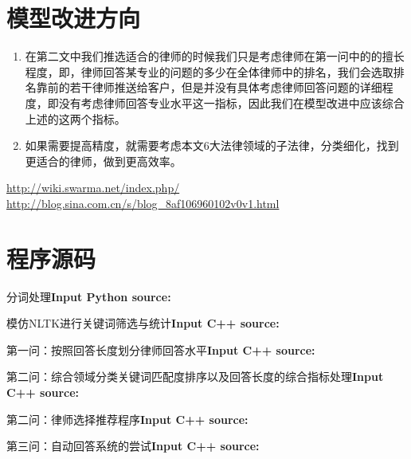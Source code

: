 \documentclass[bwprint]{cumcmthesis}
\begin{document}
\section{模型改进方向}
\begin{enumerate}
	\item 在第二文中我们推选适合的律师的时候我们只是考虑律师在第一问中的的擅长程度，即，律师回答某专业的问题的多少在全体律师中的排名，我们会选取排名靠前的若干律师推送给客户，但是并没有具体考虑律师回答问题的详细程度，即没有考虑律师回答专业水平这一指标，因此我们在模型改进中应该综合上述的这两个指标。
	\item 如果需要提高精度，就需要考虑本文6大法律领域的子法律，分类细化，找到更适合的律师，做到更高效率。
\end{enumerate}
\begin{thebibliography}{9}
  \url{http://wiki.swarma.net/index.php/}
  \url{http://blog.sina.com.cn/s/blog_8af106960102v0v1.html}
\end{thebibliography}
\appendix

\section{}
\section*{程序源码}

分词处理\textcolor[rgb]{0.98,0.00,0.00}{\textbf{Input Python source:}}

模仿NLTK进行关键词筛选与统计\textcolor[rgb]{0.98,0.00,0.00}{\textbf{Input C++ source:}}

第一问：按照回答长度划分律师回答水平\textcolor[rgb]{0.98,0.00,0.00}{\textbf{Input C++ source:}}

第二问：综合领域分类关键词匹配度排序以及回答长度的综合指标处理\textcolor[rgb]{0.98,0.00,0.00}{\textbf{Input C++ source:}}

第二问：律师选择推荐程序\textcolor[rgb]{0.98,0.00,0.00}{\textbf{Input C++ source:}}

第三问：自动回答系统的尝试\textcolor[rgb]{0.98,0.00,0.00}{\textbf{Input C++ source:}}

\end{document}

